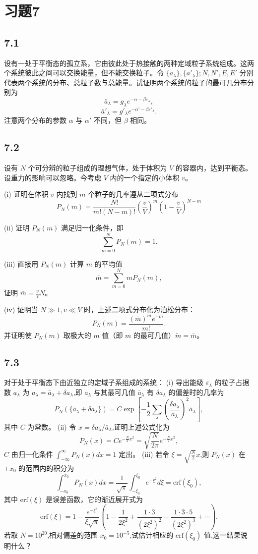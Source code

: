 \section{习题7}

\newpage
\subsection{7.1}
设有一处于平衡态的孤立系，它由彼此处于热接触的两种定域粒子系统组成。这两个系统彼此之间可以交换能量，但不能交换粒子。令 $\{a_{\lambda}\}, \{a'_{\lambda}\}; N, N', E, E'$ 分别代表两个系统的分布、总粒子数与总能量。试证明两个系统的粒子的最可几分布分别为
$$\bar{a}_{\lambda} = g_{\lambda} e^{-\alpha - \beta \varepsilon_{\lambda}},$$
$$\bar{a}'_{\lambda} = g'_{\lambda} e^{- \alpha' - \beta \varepsilon'_{\lambda}}.$$
注意两个分布的参数 $\alpha$ 与 $\alpha'$ 不同，但 $\beta$ 相同。

\newpage
\subsection{7.2}
设有 $N$ 个可分辨的粒子组成的理想气体，处于体积为 $V$ 的容器内，达到平衡态。设重力的影响可以忽略。今考虑 $V$ 内的一个指定的小体积 $v$。

(i) 证明在体积 $v$ 内找到 $m$ 个粒子的几率遵从二项式分布
$$P_N(m) = \frac{N!}{m!(N-m)!} \left( \frac{v}{V} \right)^m \left( 1 - \frac{v}{V} \right)^{N-m}$$

(ii) 证明 $P_N(m)$ 满足归一化条件，即
$$\sum_{m=0}^N P_N(m) = 1.$$

(iii) 直接用 $P_N(m)$ 计算 $m$ 的平均值
$$\bar{m} = \sum_{m=0}^N m P_N(m),$$
证明 $\bar{m} = \frac{v}{V} N$。

(iv) 证明当 $N \gg 1, v \ll V$ 时，上述二项式分布化为泊松分布：
$$P_N(m) = \frac{(\bar{m})^m e^{-\bar{m}}}{m!}.$$
并证明使 $P_N(m)$ 取极大的 $m$ 值（即 $m$ 的最可几值）$\tilde{m} = \bar{m}$。

\newpage
\subsection{7.3}
对于处于平衡态下由近独立的定域子系组成的系统：
(i) 导出能级 $\varepsilon_\lambda$ 的粒子占据数 $a_\lambda$ 为 $a_\lambda = \bar{a}_\lambda + \delta a_\lambda$,即 $a_\lambda$ 与其最可几值 $\bar{a}_\lambda$ 有 $\delta a_\lambda$ 的偏差时的几率为
$$P_N(\{\bar{a}_\lambda + \delta a_\lambda\}) = C \exp\left[ -\frac{1}{2} \sum_{\lambda} \left( \frac{\delta a_\lambda}{\bar{a}_\lambda} \right)^2 \bar{a}_\lambda \right],$$
其中 $C$ 为常数。
(ii) 令 $x = \delta a_\lambda / \bar{a}_\lambda$,证明上述公式化为
$$P_N(x) = C e^{-\frac{N}{2}x^2} = \sqrt{\frac{N}{2\pi}} e^{-\frac{N}{2}x^2},$$
$C$ 由归一化条件 $\int_{-\infty}^{\infty} P_N(x) dx = 1$ 定出。
(iii) 若令 $\xi = \sqrt{\frac{N}{2}} x$,则 $P_N(x)$ 在 $\pm x_0$ 的范围内的积分为
$$\int_{-x_0}^{x_0} P_N(x) dx = \frac{1}{\sqrt{\pi}} \int_{-\xi_0}^{\xi_0} e^{-\xi^2} d\xi = \text{erf}(\xi_0),$$
其中 $\text{erf}(\xi)$ 是误差函数，它的渐近展开式为
$$\text{erf}(\xi) = 1 - \frac{e^{-\xi^2}}{\xi \sqrt{\pi}} \left( 1 - \frac{1}{2\xi^2} + \frac{1 \cdot 3}{(2\xi^2)^2} - \frac{1 \cdot 3 \cdot 5}{(2\xi^2)^3} + \cdots \right).$$
若取 $N = 10^{20}$,相对偏差的范围 $x_0 = 10^{-5}$,试估计相应的 $\text{erf}(\xi_0)$ 值,这一结果说明什么？

